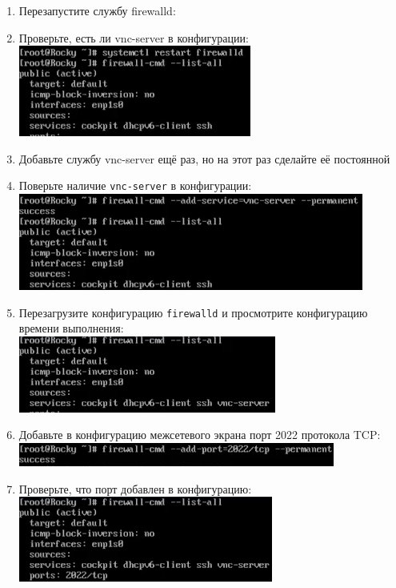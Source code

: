 \documentclass[12pt]{article}
\begin{document}
\begin{enumerate}
	\item Перезапустите службу firewalld:
	\item Проверьте, есть ли vnc-server в конфигурации:
	      \\\includegraphics{7.png}
	\item Добавьте службу vnc-server ещё раз, но на этот раз сделайте её постоянной
	\item Поверьте наличие \texttt{vnc-server} в конфигурации:
	      \\\includegraphics{8.png}
	\item Перезагрузите конфигурацию \texttt{firewalld} и просмотрите конфигурацию времени выполнения:
	      \\\includegraphics{9.png}
	\item Добавьте в конфигурацию межсетевого экрана порт 2022 протокола TCP:
	      \\\includegraphics{10.png}
	\item Проверьте, что порт добавлен в конфигурацию:
	      \\\includegraphics{11.png}
\end{enumerate}
\end{document}
